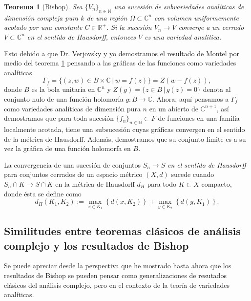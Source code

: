 \documentclass{article}
\newtheorem{teorema}{Teorema}[section]
\newcommand{\nat}{\ensuremath{ \mathbb N }}
\newcommand{\co}{\ensuremath{\mathbb C }}
\newcommand{\con}{\ensuremath{\mathbb{C}^n}}
\newcommand{\re}{\ensuremath{\mathbb R }}
\begin{document}
\begin{teorema}[Bishop]\label{Bishop2}
        Sea $\{ V_n \}_{n\in\nat}$ una sucesi\'on de subvariedades anal\'iticas de dimensi\'on compleja pura $k$ de una regi\'on 
        $\Omega\subset\con$ con volumen uniformemente acotado por una constante $C\in\re^{+}$.
        Si la sucesi\'on $V_n\rightarrow V$ converge a un cerrado $V\subset\con$ en el sentido de Hausdorff, entonces $V$ es una
        variedad anal\'itica. 
\end{teorema}
Esto debido a que Dr. Verjovsky y yo demostramos el resultado de Montel por medio del teorema \ref{Bishop2} pensando a las gr\'aficas de las
funciones como variedades anal\'iticas
\[
        \Gamma_{f}=\{(z,w)\in B\times\co\,|\,w=f(z)\}=Z(w-f(z)),
\]
\noindent donde $B$ es la bola unitaria en $\con$ y $Z(g)=\{z\in B\,|\,g(z)=0\}$ denota al conjunto nulo de una funci\'on holomorfa $g:B\rightarrow\co$. Ahora, aqu\'i pensamos a $\Gamma_{f}$ como variedades anal\'iticas de dimensi\'on pura $n$ en un abierto de $\co^{n+1}$, as\'i demostramos
que para toda sucesi\'on $\{f_n\}_{n\in\nat}\subset F$ de funciones en una familia localmente acotada, tiene una subsucesi\'on 
cuyas gr\'aficas convergen en el sentido de la m\'etrica de Hausdorff. Adem\'as, demostramos que su conjunto l\'imite 
es a su vez la gr\'afica de una funci\'on holomorfa en $B$.

La convergencia de una sucesi\'on de conjuntos $S_n\rightarrow S$ \emph{en el sentido de Hausdorff} para conjuntos cerrados de un espacio m\'etrico $(X,d)$
sucede cuando $S_n\cap K\rightarrow S\cap K$ en la m\'etrica de Hausdorff $d_H$ para todo $K\subset X$ compacto, donde \'esta se define como
\[
        d_H(K_1,K_2):= \max_{x\in K_1}\left\{d(x,K_2)\right\}+\max_{y\in K_2}\left\{d(y,K_1)\right\}. 
\]

\subsection{Similitudes entre teoremas cl\'asicos de an\'alisis complejo y los resultados de Bishop}

\noindent Se puede apreciar desde la perspectiva que he mostrado hasta ahora que los resultados de Bishop se pueden pensar 
como generalizaciones de resutados cl\'asicos del an\'alisis complejo, pero en el contexto de la teor\'ia de variedades anal\'iticas.
\end{document}
